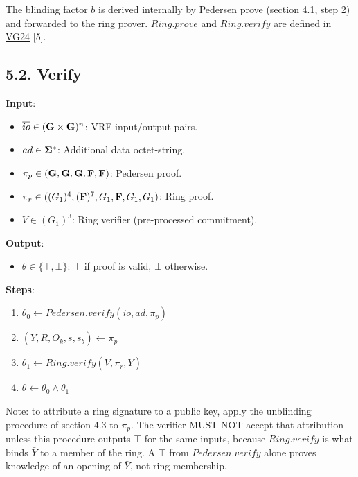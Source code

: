 \documentclass[
]{article}
\providecommand{\tightlist}{%
  \setlength{\itemsep}{0pt}\setlength{\parskip}{0pt}}
\begin{document}
The blinding factor \(b\) is derived internally by Pedersen prove
(section 4.1, step 2) and forwarded to the ring prover. \(Ring.prove\)
and \(Ring.verify\) are defined in
\href{https://github.com/davxy/ring-proof-spec}{VG24} {[}5{]}.

\subsection{5.2. Verify}\label{verify-3}

\textbf{Input}:

\begin{itemize}
\tightlist
\item
  \(\overline{io} \in (\bold{G}\times \bold{G})^n\): VRF input/output
  pairs.
\item
  \(ad \in \bold{\Sigma}^*\): Additional data octet-string.
\item
  \(\pi_p \in (\bold{G}, \bold{G}, \bold{G}, \bold{F}, \bold{F})\):
  Pedersen proof.
\item
  \(\pi_r \in ((G_1)^4, (\bold{F})^7, G_1, \bold{F}, G_1, G_1)\): Ring
  proof.
\item
  \(V \in (G_1)^3\): Ring verifier (pre-processed commitment).
\end{itemize}

\textbf{Output}:

\begin{itemize}
\tightlist
\item
  \(\theta \in \{ \top, \bot \}\): \(\top\) if proof is valid, \(\bot\)
  otherwise.
\end{itemize}

\textbf{Steps}:

\begin{enumerate}
\def\labelenumi{\arabic{enumi}.}
\tightlist
\item
  \(\theta_0 \gets Pedersen.verify(\overline{io}, ad, \pi_p)\)
\item
  \((\bar{Y}, R, O_k, s, s_b) \gets \pi_p\)
\item
  \(\theta_1 \gets Ring.verify(V, \pi_r, \bar{Y})\)
\item
  \(\theta \gets \theta_0 \land \theta_1\)
\end{enumerate}

Note: to attribute a ring signature to a public key, apply the
unblinding procedure of section 4.3 to \(\pi_p\). The verifier MUST NOT
accept that attribution unless this procedure outputs \(\top\) for the
same inputs, because \(Ring.verify\) is what binds \(\bar{Y}\) to a
member of the ring. A \(\top\) from \(Pedersen.verify\) alone proves
knowledge of an opening of \(\bar{Y}\), not ring membership.
\end{document}
